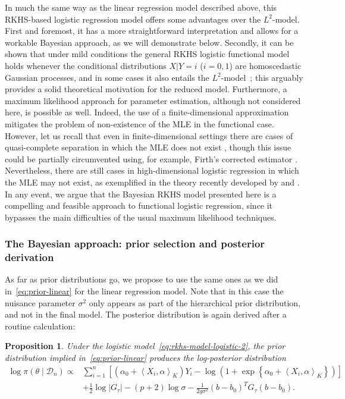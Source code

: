 \documentclass{article}
\numberwithin{equation}{section}
\theoremstyle{plain}
\newtheorem{proposition}{Proposition}[section]
\newcommand\dotprod[2]{\left\langle#1,#2\right\rangle}
\begin{document}
In much the same way as the linear regression model described above, this RKHS-based logistic regression model offers some advantages over the \(L^2\)-model. First and foremost, it has a more straightforward interpretation and allows for a workable Bayesian approach, as we will demonstrate below. Secondly, it can be shown that under mild conditions the general RKHS logistic functional model holds whenever the conditional distributions \(X | Y=i\) (\(i=0,1\)) are homoscedastic Gaussian processes, and in some cases it also entails the \(L^2\)-model~\citep[see Section~4 in][]{berrendero2023functional}; this arguably provides a solid theoretical motivation for the reduced model. Furthermore, a maximum likelihood approach for parameter estimation, although not considered here, is possible as well. Indeed, the use of a finite-dimensional approximation  mitigates the problem of non-existence of the MLE in the functional case. However, let us recall that even in finite-dimensional settings there are cases of quasi-complete separation in which the MLE does not exist \citep{albert1984existence}, though this issue could be partially circumvented using, for example, Firth's corrected estimator \citep{firth1993bias}. Nevertheless, there are still cases in high-dimensional logistic regression in which the MLE may not exist, as exemplified in the theory recently developed by \citet{sur2019modern} and \citet{candes2020phase}. In any event, we argue that the Bayesian RKHS model presented here is a compelling and feasible approach to functional logistic regression, since it bypasses the main difficulties of the usual maximum likelihood techniques.

\subsubsection*{The Bayesian approach: prior selection and posterior derivation}

As far as prior distributions go, we propose to use the same ones as we did in~\eqref{eq:prior-linear} for the linear regression model. Note that in this case the nuisance parameter \(\sigma^2\) only appears as part of the hierarchical prior distribution, and not in the final model. The posterior distribution is again derived after a routine calculation:

\begin{proposition}
  Under the logistic model~\eqref{eq:rkhs-model-logistic-2}, the prior distribution implied in~\eqref{eq:prior-linear} produces the log-posterior distribution
  \begin{align*}
    \log \pi(\theta \mid \mathcal D_n) \propto {} & \sum_{i=1}^n \left[ \left(\alpha_0 + \dotprod{X_i}{\alpha}_K\right)Y_i - \log\left(1 + \exp\left\{\alpha_0 +\dotprod{X_i}{\alpha}_K\right\}\right)\right] \\
    \quad                                         & + \frac{1}{2}\log |G_\tau| - (p+2)\log \sigma -\frac{1}{2g\sigma^2} (b - b_0)^T G_\tau(b - b_0).
  \end{align*}
\end{proposition}
\end{document}
